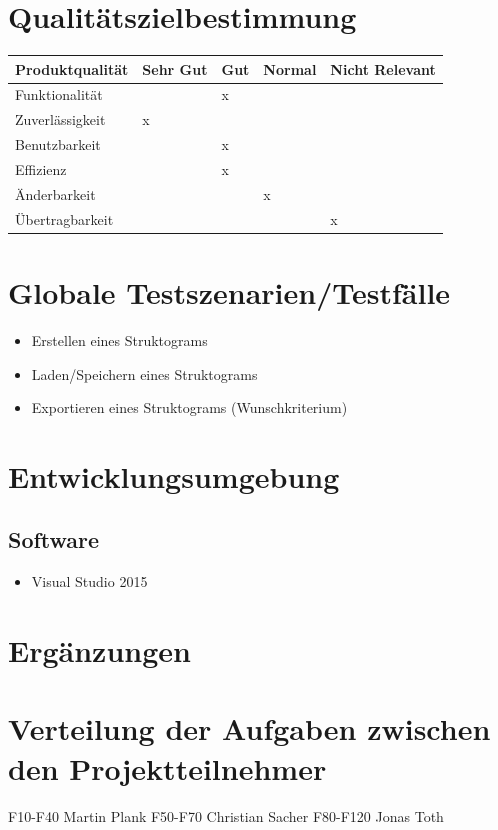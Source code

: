 \documentclass[a4paper,10pt]{report}
\begin{document}
\section{Qualitätszielbestimmung}

\begin{center}
  \begin{tabular}{| l | l | l | l | l |}
    \hline
   	 Produktqualität & Sehr Gut & Gut  & Normal & Nicht Relevant \\ \hline
    	 Funktionalität &   &  x &  & \\ \hline
 	 Zuverlässigkeit & x  &   &  & \\ \hline
 	Benutzbarkeit &   &  x &  & \\ \hline
      	 Effizienz &   &  x &  & \\ \hline
      	 Änderbarkeit &   &  &  x & \\ \hline
      	Übertragbarkeit &   &   &  & x \\ \hline
  \end{tabular}
\end{center}


\section{Globale Testszenarien/Testfälle}
\begin{itemize}
\item  Erstellen eines Struktograms
\item  Laden/Speichern eines Struktograms
\item  Exportieren eines Struktograms (Wunschkriterium)
\end{itemize}
\section{Entwicklungsumgebung}
\subsection{Software}
\begin{itemize}
\item Visual Studio 2015
\end{itemize}
\section{Ergänzungen}
\section{Verteilung der Aufgaben zwischen den Projektteilnehmer}
F10-F40 Martin Plank
F50-F70 Christian Sacher
F80-F120 Jonas Toth
\end{document}
